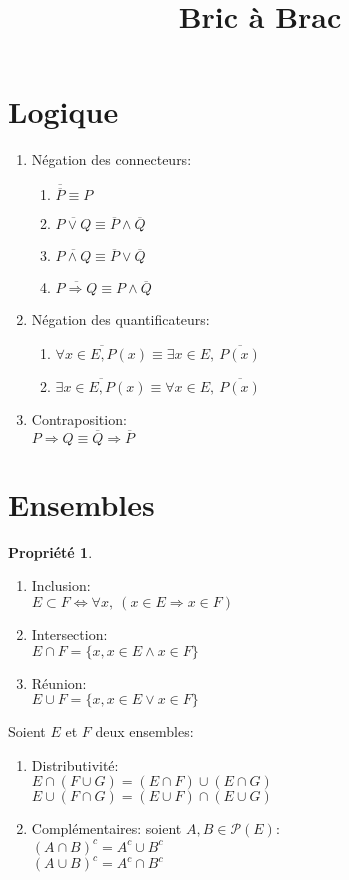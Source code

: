 \documentclass[fleqn]{article}
\title{Bric \`a Brac}
\date{}
\theoremstyle{definition} \newtheorem*{defi}{D\'efinition}
\theoremstyle{definition} \newtheorem*{theo}{Th\'eor\`eme}
\theoremstyle{definition} \newtheorem*{coro}{Corollaire}
\theoremstyle{remark} \newtheorem*{rqs}{Remarques}
\theoremstyle{definition} \newtheorem*{prop}{Propri\'et\'e}
\begin{document}
\maketitle

\section{Logique}
\begin{enumerate}
	\item N\'egation des connecteurs:
		\begin{enumerate}
			\item  $\overline{\overline{P}} \equiv  P$
			\item  $\overline{P \lor Q} \equiv \overline{P} \land \overline{Q}$
			\item  $\overline{P \land Q} \equiv \overline{P} \lor \overline{Q}$
			\item  $\overline{P \Rightarrow Q} \equiv P \land \overline{Q}$
		\end{enumerate}
	\item N\'egation des quantificateurs:
		\begin{enumerate}
			\item $\overline{\forall x \in E, P(x)} \equiv \exists x \in E,\ \overline{P(x)}$
			\item $\overline{\exists x \in E, P(x)} \equiv \forall x \in E,\ \overline{P(x)}$
		\end{enumerate}
	\item Contraposition: \\
		$P \Rightarrow Q \equiv \overline{Q} \Rightarrow \overline{P}$
\end{enumerate}

\section{Ensembles}
\begin{prop} $ $
	\begin{enumerate}
		\item Inclusion: \\
			$E \subset F \Leftrightarrow \forall x,\ (x \in E \Rightarrow x \in F)$
		\item Intersection: \\
			$E \cap F = \{ x, x\in E \land x \in F\}$
		\item R\'eunion: \\
			$E \cup F = \{x, x\in E \lor x \in F\}$
	\end{enumerate}
\end{prop}
Soient $E$ et $F$ deux ensembles:
\begin{enumerate}
	\item Distributivit\'e: \\
		\(E \cap(F \cup G) = (E \cap F) \cup (E \cap G)\) \\
		\(E \cup (F \cap G) = (E \cup F) \cap (E \cup G)\)
	\item Compl\'ementaires: soient \(A, B \in \mathcal{P}(E)\): \\
		\((A \cap B)^c = A^c \cup B^c\) \\
		\((A \cup B)^c = A^c \cap B^c\)
\end{enumerate}
\end{document}
